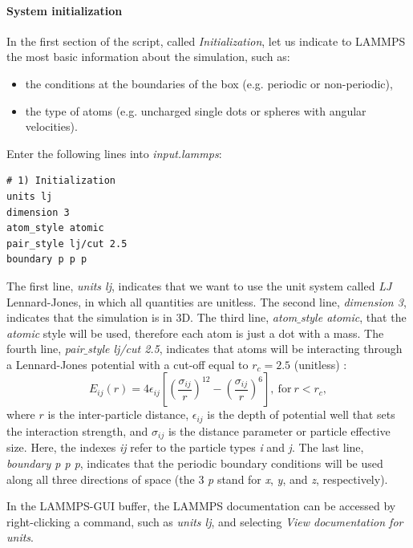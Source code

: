 \documentclass[9pt,tutorial]{livecoms}
\begin{document}
\paragraph{System initialization}
In the first section of the script, called \textit{Initialization}, let us indicate to LAMMPS the most basic information about the simulation, such as:
\begin{itemize}
\item the conditions at the boundaries of the box (e.g. periodic or non-periodic),
\item the type of atoms (e.g. uncharged single dots or spheres with angular velocities).
\end{itemize}
Enter the following lines into \textit{input.lammps}:
{\normalsize \begin{verbatim}
# 1) Initialization
units lj
dimension 3
atom_style atomic
pair_style lj/cut 2.5
boundary p p p
\end{verbatim}}
The first line, \textit{units lj}, indicates that we want to use the unit system called \textit{LJ} Lennard-Jones, in which all quantities are unitless. The second line, \textit{dimension 3}, indicates that the simulation is in 3D. The third line, \textit{atom$\_$style atomic}, that the \textit{atomic} style will be used, therefore each atom is just a dot with a mass. The fourth line, \textit{pair$\_$style lj/cut 2.5}, indicates that atoms will be interacting through a Lennard-Jones potential with a cut-off equal to $r_c = 2.5$ (unitless) \cite{wang2020lennard,fischer2023history}:
$$E_{ij} (r) = 4 \epsilon_{ij} \left[ \left( \dfrac{\sigma_{ij}}{r} \right)^{12} - \left( \dfrac{\sigma_{ij}}{r} \right)^{6} \right], ~ \text{for} ~ r < r_c,$$
where $r$ is the inter-particle distance, $\epsilon_{ij}$ is the depth of potential well that sets the interaction strength, and $\sigma_{ij}$ is the distance parameter or particle effective size. Here, the indexes \textit{ij} refer to the particle types \textit{i} and \textit{j}. The last line, \textit{boundary p p p}, indicates that the periodic boundary conditions will be used along all three directions of space (the 3 \textit{p} stand for \textit{x}, \textit{y}, and \textit{z}, respectively).

In the LAMMPS-GUI buffer, the LAMMPS documentation can be accessed by right-clicking a command, such as \textit{units lj}, and selecting \textit{View documentation for units}.
\end{document}
